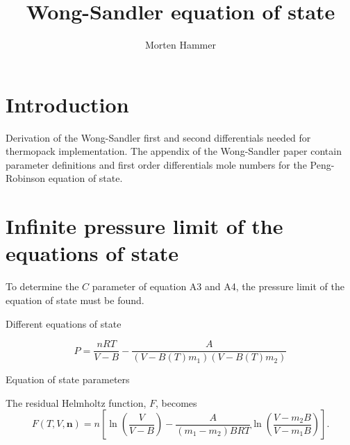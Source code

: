 \documentclass[english]{../thermomemo/thermomemo}
\title{Wong-Sandler equation of state}
\author{Morten Hammer}
\newcommand*{\vektor}[1]{\boldsymbol{#1}}%
\newcommand{\wrpt}{\text{with respect to}\xspace}
\begin{document}
\frontmatter
\tableofcontents
\section{Introduction}
Derivation of the Wong-Sandler first and second differentials needed
for thermopack implementation\cite{Wong1992}. The appendix of the
Wong-Sandler paper contain parameter definitions and first order
differentials \wrpt mole numbers for the Peng-Robinson equation of state. 
\section{Infinite pressure limit of the equations of state}
To determine the $C$ parameter of equation A3 and A4, the pressure
limit of the equation of state must be found.

\begin{table}[htb]
\begin{minipage}[l]{0.58\linewidth}
\caption{Different equations of state}
\vspace{-3mm}

\label{tab:eos}
\end{minipage}
\end{table}

\begin{equation}
P=\frac{nRT}{V-B}-\frac{A}{\left(V-B(T)m_1\right)\left(V-B(T)m_2\right)}
\label{eq:eosg}
\end{equation}

\begin{table}[htb]
\begin{minipage}[l]{0.58\linewidth}
\caption{Equation of state parameters}
\vspace{-3mm}

\label{tab:eos2}
\end{minipage}
\end{table}

The residual Helmholtz function, $F$, becomes
\begin{equation}
  F(T,V,\vektor{n})=
  n\left[\ln\left(\frac{V}{V-B}\right)-\frac{A}{\left(m_1-m_2\right)BRT}\ln\left(\frac{V-m_2B}{V-m_1B}\right) \right].
\end{equation}
\end{document}
